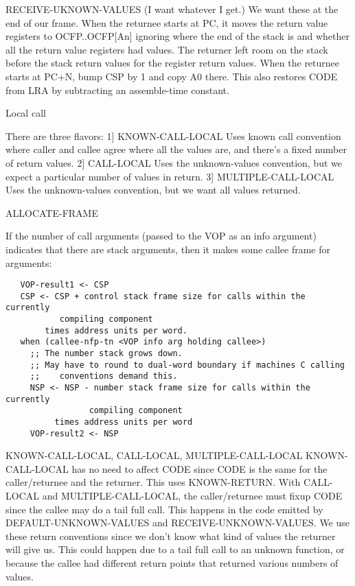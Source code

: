 RECEIVE-UKNOWN-VALUES
(I want whatever I get.)
We want these at the end of our frame.  When the returnee starts at
PC, it moves the return value registers to OCFP..OCFP[An] ignoring where
the end of the stack is and whether all the return value registers had
values.  The returner left room on the stack before the stack return values
for the register return values.  When the returnee starts at PC+N, bump CSP
by 1 and copy A0 there.
This also restores CODE from LRA by subtracting an assemble-time constant.


Local call

There are three flavors:
   1] KNOWN-CALL-LOCAL
      Uses known call convention where caller and callee agree where all
      the values are, and there's a fixed number of return values.
   2] CALL-LOCAL
      Uses the unknown-values convention, but we expect a particular
      number of values in return.
   3] MULTIPLE-CALL-LOCAL
      Uses the unknown-values convention, but we want all values returned.

ALLOCATE-FRAME

If the number of call arguments (passed to the VOP as an info argument)
indicates that there are stack arguments, then it makes some callee frame for
arguments:
\begin{verbatim}
   VOP-result1 <- CSP
   CSP <- CSP + control stack frame size for calls within the currently
   		   compiling component
   		times address units per word.
   when (callee-nfp-tn <VOP info arg holding callee>)
     ;; The number stack grows down.
     ;; May have to round to dual-word boundary if machines C calling
     ;;    conventions demand this.
     NSP <- NSP - number stack frame size for calls within the currently
     		     compiling component
		  times address units per word
     VOP-result2 <- NSP
\end{verbatim}
KNOWN-CALL-LOCAL, CALL-LOCAL, MULTIPLE-CALL-LOCAL
KNOWN-CALL-LOCAL has no need to affect CODE since CODE is the same for the
caller/returnee and the returner.  This uses KNOWN-RETURN.
With CALL-LOCAL and MULTIPLE-CALL-LOCAL, the caller/returnee must fixup
CODE since the callee may do a tail full call.  This happens in the code
emitted by DEFAULT-UNKNOWN-VALUES and RECEIVE-UNKNOWN-VALUES.  We use these
return conventions since we don't know what kind of values the returner
will give us.  This could happen due to a tail full call to an unknown
function, or because the callee had different return points that returned
various numbers of values.

